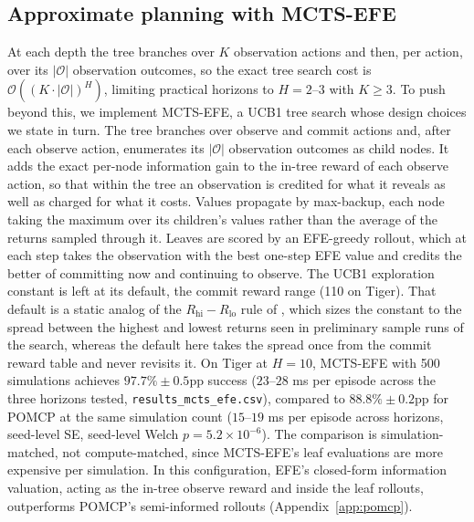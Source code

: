 \subsection{Approximate planning with MCTS-EFE}
At each depth the tree branches over $K$ observation actions and then, per action, over its $|\mathcal{O}|$ observation outcomes, so the exact tree search cost is $\mathcal{O}((K \cdot |\mathcal{O}|)^H)$, limiting practical horizons to $H{=}2$--$3$ with $K \geq 3$. To push beyond this, we implement MCTS-EFE, a UCB1 tree search whose design choices we state in turn. The tree branches over observe and commit actions and, after each observe action, enumerates its $|\mathcal{O}|$ observation outcomes as child nodes. It adds the exact per-node information gain to the in-tree reward of each observe action, so that within the tree an observation is credited for what it reveals as well as charged for what it costs. Values propagate by max-backup, each node taking the maximum over its children's values rather than the average of the returns sampled through it. Leaves are scored by an EFE-greedy rollout, which at each step takes the observation with the best one-step EFE value and credits the better of committing now and continuing to observe. The UCB1 exploration constant is left at its default, the commit reward range (110 on Tiger). That default is a static analog of the $R_{\mathrm{hi}} - R_{\mathrm{lo}}$ rule of \citet{silver2010}, which sizes the constant to the spread between the highest and lowest returns seen in preliminary sample runs of the search, whereas the default here takes the spread once from the commit reward table and never revisits it. On Tiger at $H{=}10$, MCTS-EFE with 500 simulations achieves $97.7\% \pm 0.5$pp success ($23$--$28$ ms per episode across the three horizons tested, \texttt{results\_\allowbreak mcts\_\allowbreak efe.csv}), compared to $88.8\% \pm 0.2$pp for POMCP at the same simulation count ($15$--$19$ ms per episode across horizons, seed-level SE, seed-level Welch $p{=}5.2{\times}10^{-6}$). The comparison is simulation-matched, not compute-matched, since MCTS-EFE's leaf evaluations are more expensive per simulation. In this configuration, EFE's closed-form information valuation, acting as the in-tree observe reward and inside the leaf rollouts, outperforms POMCP's semi-informed rollouts (Appendix~\ref{app:pomcp}).

